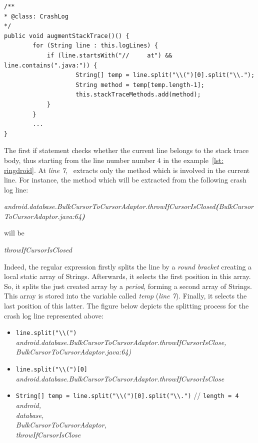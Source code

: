 \begin{enumerate}
\begin{lstlisting}[caption=Regular expression for extracting all methods from a stack trace,label={lst: augmentstack}]
/**
* @class: CrashLog
*/
public void augmentStackTrace()() {
        for (String line : this.logLines) {
            if (line.startsWith("// 	at") && line.contains(".java:")) {
            		String[] temp = line.split("\\(")[0].split("\\.");
            		String method = temp[temp.length-1];
            		this.stackTraceMethods.add(method);
            }
        }
        ...
}
\end{lstlisting}
The first if statement checks whether the current line belongs to the stack trace body, thus starting from the line number number 4 in the example~\ref{lst: ringdroid}. 
At \textit{line 7}, \toolname\ extracts only the method which is involved in the current line. 
For instance, the method which will be extracted from the following crash log line: 
\begin{center}
\smallbreak
\emph{\small android.database.BulkCursorToCursorAdaptor.throwIfCursorIsClosed\textbf{(}BulkCursorToCursorAdaptor.java:64\textbf{)}}
\end{center} 
will be
\begin{center}
\emph{throwIfCursorIsClosed}
\end{center} 
Indeed, the regular expression firstly splits the line by a \textit{round bracket} creating a local static array of Strings. Afterwards, it selects the first position in this array. So, it splits the just created array by a \textit{period}, forming a second array of Strings. 
This array is stored into the variable called \textit{temp} (\textit{line 7}).
Finally, it selects the last position of this latter. 
The figure below depicts the splitting process for the crash log line represented above: 
\begin{itemize}

\item \texttt{line.split({\color{blue}"\textbackslash\textbackslash("})} \\
\emph{android.database.BulkCursorToCursorAdaptor.throwIfCursorIsClose,\\ BulkCursorToCursorAdaptor.java:64)}


\item \texttt{line.split({\color{blue}"\textbackslash\textbackslash("})[0]} \\
\emph{android.database.BulkCursorToCursorAdaptor.throwIfCursorIsClose}

\item \texttt{String[] temp = line.split({\color{blue}"\textbackslash\textbackslash("})[0].split({\color{blue}"\textbackslash\textbackslash."})} 
{\color{brown}// {\small \texttt{length = 4} }}\\
\emph{android, \\database, \\BulkCursorToCursorAdaptor, \\throwIfCursorIsClose}


\end{itemize}
\end{enumerate}
